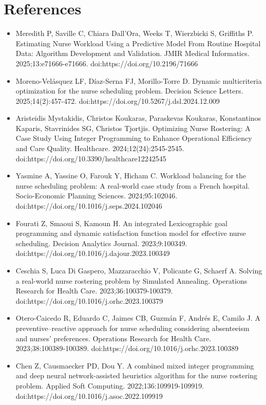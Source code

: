 \documentclass[10pt,a4paper,twocolumn]{article}
\begin{document}
\section{References}
\begin{itemize}[leftmargin=*]
\item [1] Meredith P, Saville C, Chiara Dall'Ora, Weeks T, Wierzbicki S, Griffiths P. Estimating Nurse Workload Using a Predictive Model From Routine Hospital Data: Algorithm Development and Validation. JMIR Medical Informatics. 2025;13:e71666-e71666. doi:https://doi.org/10.2196/71666
\item [2] Moreno-Velásquez LF, Díaz-Serna FJ, Morillo-Torre D. Dynamic multicriteria optimization for the nurse scheduling problem. Decision Science Letters. 2025;14(2):457-472. doi:https://doi.org/10.5267/j.dsl.2024.12.009
\item [3] Aristeidis Mystakidis, Christos Koukaras, Paraskevas Koukaras, Konstantinos Kaparis, Stavrinides SG, Christos Tjortjis. Optimizing Nurse Rostering: A Case Study Using Integer Programming to Enhance Operational Efficiency and Care Quality. Healthcare. 2024;12(24):2545-2545. doi:https://doi.org/10.3390/healthcare12242545
\item [4] Yasmine A, Yassine O, Farouk Y, Hicham C. Workload balancing for the nurse scheduling problem: A real-world case study from a French hospital. Socio-Economic Planning Sciences. 2024;95:102046. doi:https://doi.org/10.1016/j.seps.2024.102046
\item [5] Fourati Z, Smaoui S, Kamoun H. An integrated Lexicographic goal programming and dynamic satisfaction function model for effective nurse scheduling. Decision Analytics Journal. 2023;9:100349. doi:https://doi.org/10.1016/j.dajour.2023.100349
\item [6] Ceschia S, Luca Di Gaspero, Mazzaracchio V, Policante G, Schaerf A. Solving a real-world nurse rostering problem by Simulated Annealing. Operations Research for Health Care. 2023;36:100379-100379. doi:https://doi.org/10.1016/j.orhc.2023.100379
\item [7] Otero-Caicedo R, Eduardo C, Jaimes CB, Guzmán F, Andrés E, Camilo J. A preventive–reactive approach for nurse scheduling considering absenteeism and nurses' preferences. Operations Research for Health Care. 2023;38:100389-100389. doi:https://doi.org/10.1016/j.orhc.2023.100389
\item [8] Chen Z, Causmaecker PD, Dou Y. A combined mixed integer programming and deep neural network-assisted heuristics algorithm for the nurse rostering problem. Applied Soft Computing. 2022;136:109919-109919. doi:https://doi.org/10.1016/j.asoc.2022.109919

\end{itemize}
\end{document}
